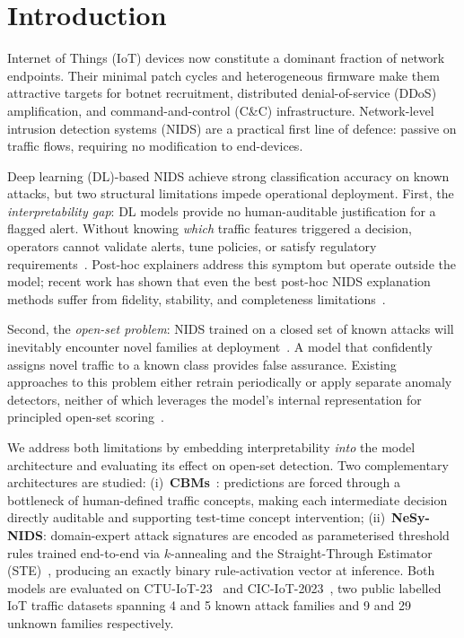 \documentclass[conference]{IEEEtran}
\begin{document}
\section{Introduction}

Internet of Things (IoT) devices now constitute a dominant fraction of
network endpoints. Their minimal patch cycles and heterogeneous firmware
make them attractive targets for botnet recruitment, distributed
denial-of-service (DDoS) amplification, and command-and-control (C\&C)
infrastructure. Network-level intrusion detection systems (NIDS) are a
practical first line of defence: passive on traffic flows, requiring no
modification to end-devices.

Deep learning (DL)-based NIDS achieve strong classification accuracy on
known attacks, but two structural limitations impede operational deployment.
First, the \emph{interpretability gap}: DL models provide no
human-auditable justification for a flagged alert. Without knowing
\emph{which} traffic features triggered a decision, operators cannot
validate alerts, tune policies, or satisfy regulatory requirements~\cite{rudin2019stop,arp2022dos}.
Post-hoc explainers address this symptom but operate outside the model;
recent work has shown that even the best post-hoc NIDS explanation methods
suffer from fidelity, stability, and completeness limitations~\cite{wei2023xnids}.

Second, the \emph{open-set problem}: NIDS trained on a closed set of known
attacks will inevitably encounter novel families at deployment~\cite{arp2022dos}.
A model that confidently assigns novel traffic to a known class provides false
assurance. Existing approaches to this problem either retrain periodically
or apply separate anomaly detectors, neither of which leverages the
model's internal representation for principled open-set scoring~\cite{han2023owad}.

We address both limitations by embedding interpretability \emph{into} the
model architecture and evaluating its effect on open-set detection.
Two complementary architectures are studied:
(i)~\textbf{CBMs}~\cite{koh2020concept}: predictions are forced through
a bottleneck of human-defined traffic concepts, making each intermediate
decision directly auditable and supporting test-time concept intervention;
(ii)~\textbf{NeSy-NIDS}: domain-expert attack signatures are encoded as
parameterised threshold rules trained end-to-end via $k$-annealing and the
Straight-Through Estimator (STE)~\cite{bengio2013ste,liu2023reinmax},
producing an exactly binary rule-activation vector at inference.
Both models are evaluated on CTU-IoT-23~\cite{parmisano2020ctu} and
CIC-IoT-2023~\cite{neto2023ciciot}, two public labelled IoT traffic datasets
spanning 4 and 5 known attack families and 9 and 29 unknown families
respectively.
\end{document}
